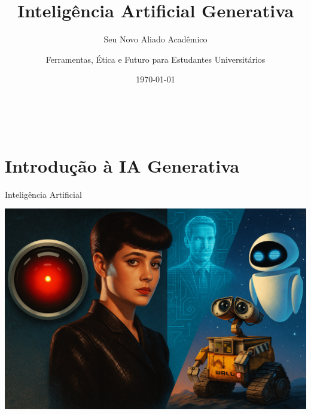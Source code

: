 \documentclass[aspectratio=169,12pt]{beamer}
\title[IA Generativa]{Inteligência Artificial Generativa}
\subtitle{Seu Novo Aliado Acadêmico}
\author{Ferramentas, Ética e Futuro para Estudantes Universitários}
\institute{Universidade}
\date{\today}
\begin{document}

\begin{frame}
    \titlepage
    \begin{center}
        \textcolor{accent}{\faRobot\, \faBrain\, \faGraduationCap}
    \end{center}
\end{frame}


\section{Introdução à IA Generativa}

\begin{frame}{Inteligência Artificial}
    \begin{center}
        
\includegraphics[scale=0.2]{diferentesia.png}
    \end{center}
\end{frame}
\end{document}
